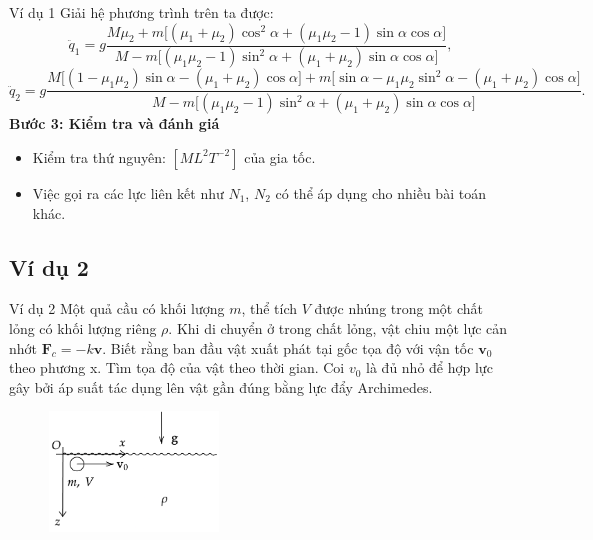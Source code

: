 \begin{frame}{Ví dụ 1}
    Giải hệ phương trình trên ta được:
    \begin{equation*}
    \ddot q_1 =
g \frac{ 
M\mu_2 + m\Big[(\mu_1+\mu_2)\cos^2\alpha + (\mu_1\mu_2-1)\sin\alpha\cos\alpha\Big]}
{ M - m\Big[(\mu_1\mu_2-1)\sin^2\alpha + (\mu_1+\mu_2)\sin\alpha\cos\alpha\Big] },
\end{equation*}
    \begin{equation*}
        \ddot q_2 =
g  
\frac{ M\Big[ (1-\mu_1\mu_2)\sin\alpha - (\mu_1+\mu_2)\cos\alpha \Big]
+ m\Big[ \sin\alpha - \mu_1\mu_2\sin^2\alpha - (\mu_1+\mu_2)\cos\alpha \Big]}
{ M - m\Big[ (\mu_1\mu_2-1)\sin^2\alpha + (\mu_1+\mu_2)\sin\alpha\cos\alpha \Big]}.
    \end{equation*}
\textbf{Bước 3: Kiểm tra và đánh giá}
\begin{itemize}
    \item Kiểm tra thứ nguyên: \([ML^2T^{-2}]\) của gia tốc.
    \item Việc gọi ra các lực liên kết như \(N_1\), \(N_2\) có thể áp dụng cho nhiều bài toán khác.
\end{itemize}
\end{frame}

\subsection{Ví dụ 2}
\begin{frame}{Ví dụ 2}
    Một quả cầu có khối lượng \(m\), thể tích \(V\) được nhúng trong một chất lỏng có khối lượng riêng \(\rho\). Khi di chuyển ở trong chất lỏng, vật chiu một lực cản nhớt \(\mathbf F_c=-k\mathbf v\). Biết rằng ban đầu vật xuất phát tại gốc tọa độ với vận tốc \(\mathbf v_0\) theo phương x. Tìm tọa độ của vật theo thời gian. Coi \(v_0\) là đủ nhỏ để hợp lực gây bởi áp suất tác dụng lên vật gần đúng bằng lực đẩy Archimedes.
\begin{figure}
    \centering
    \includegraphics[width=0.4\textwidth]{Slides/Figure/masatnhot.png}
\end{figure}
\end{frame}

